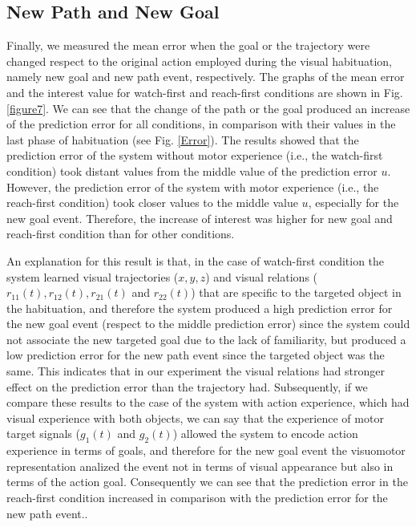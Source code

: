 \documentclass[conference]{IEEEtran}
\begin{document}
\subsection{New Path and New Goal}
Finally, we measured the mean error when the goal or the trajectory were changed respect to the original action employed during the visual habituation, namely new goal and new path event, respectively. The graphs of the mean error and the interest value for watch-first and reach-first conditions are shown in Fig. \ref{figure7}. We can see that the change of the path or the goal produced an increase of the prediction error for all conditions, in comparison with their values in the last phase of habituation (see Fig. \ref{Error}). The results showed that the prediction error of the system without motor experience (i.e., the watch-first condition) took distant values from the middle value of the prediction error \(\textit{u}\). However, the prediction error of the system with motor experience (i.e., the reach-first condition) took closer values to the middle value \(\textit{u}\), especially for the new goal event. Therefore, the increase of interest was higher for new goal and reach-first condition than for other conditions. 

An explanation for this result is that, in the case of watch-first condition the system learned visual trajectories ($x,y,z$) and visual relations ($r_{11}(t), r_{12}(t), r_{21}(t)$ and $r_{22}(t)$) that are specific to the targeted object in the habituation, and therefore the system produced a high prediction error for the new goal event (respect to the middle prediction error) since the system could not associate the new targeted goal due to the lack of familiarity, but produced a low prediction error for the new path event since the targeted object was the same. This indicates that in our experiment the visual relations had stronger effect on the prediction error than the trajectory had. Subsequently, if we compare these results to the case of the system with action experience, which had visual experience with both objects, we can say that the experience of motor target signals ($g_{1}(t)$ and $g_{2}(t)$) allowed the system to encode action experience in terms of goals, and therefore for the new goal event the visuomotor representation analized the event not in terms of visual appearance but also in terms of the action goal. Consequently we can see that the prediction error in the reach-first condition increased in comparison with the prediction error for the new path event..
\end{document}
